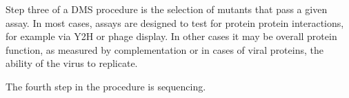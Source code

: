 Step three of a DMS procedure is the selection of mutants that pass a given assay. In most cases, assays are designed to test for protein protein interactions, for example via Y2H or phage display. In other cases it may be overall protein function, as measured by complementation or in cases of viral proteins, the ability of the virus to replicate.

The fourth step in the procedure is sequencing. 


